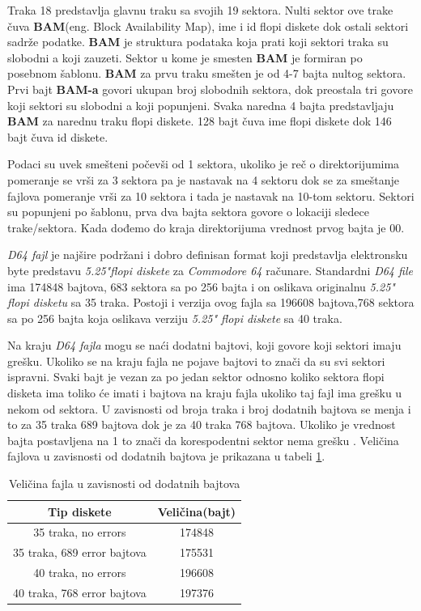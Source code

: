 Traka 18 predstavlja glavnu traku sa svojih 19 sektora. Nulti sektor ove trake čuva \textbf{BAM}(eng. Block Availability Map), ime i id flopi diskete dok ostali sektori sadrže podatke. \textbf{BAM} je struktura podataka koja prati koji sektori traka su slobodni a koji zauzeti. Sektor u kome je smesten \textbf{BAM} je formiran po posebnom šablonu. \textbf{BAM} za prvu traku smešten je od 4-7 bajta nultog sektora. Prvi bajt \textbf{BAM-a} govori ukupan broj slobodnih sektora, dok preostala tri govore koji sektori su slobodni a koji popunjeni. Svaka naredna 4 bajta predstavljaju \textbf{BAM} za narednu traku flopi diskete. 128 bajt čuva ime flopi diskete dok 146 bajt čuva id diskete.

Podaci su uvek smešteni počevši od 1 sektora, ukoliko je reč o direktorijumima pomeranje se vrši za 3 sektora pa je nastavak na 4 sektoru dok se za smeštanje fajlova pomeranje vrši za 10 sektora i tada je nastavak na 10-tom sektoru. Sektori su popunjeni po šablonu, prva dva bajta sektora govore o lokaciji sledece trake/sektora. Kada dođemo do kraja direktorijuma vrednost prvog bajta je 00.

\textit{D64 fajl} je najšire podržani i dobro definisan format koji predstavlja elektronsku byte predstavu \textit{5.25"flopi diskete} za \textit{Commodore 64} računare. Standardni \textit{D64 file} ima 174848 bajtova, 683 sektora sa po 256 bajta i on oslikava originalnu \textit{5.25" flopi disketu} sa 35 traka.  Postoji i verzija ovog fajla sa 196608 bajtova,768 sektora sa po 256 bajta koja oslikava verziju \textit{5.25" flopi diskete} sa 40 traka.

Na kraju \textit{D64 fajla} mogu se naći dodatni bajtovi, koji govore koji sektori imaju grešku. Ukoliko se na kraju fajla ne pojave bajtovi to znači da su svi sektori ispravni. Svaki bajt je vezan za po jedan sektor odnosno koliko sektora flopi disketa ima toliko će imati i bajtova na kraju fajla ukoliko taj fajl ima grešku u nekom od sektora. U zavisnosti od broja traka i broj dodatnih bajtova se menja i to za 35 traka 689 bajtova dok je za 40 traka 768 bajtova. Ukoliko je vrednost bajta postavljena na 1 to znači da korespodentni sektor nema grešku \cite{D64}. Veličina fajlova u zavisnosti od dodatnih bajtova je prikazana u tabeli \ref{tab:error_velicina}.
\begin{table}[h!]
\begin{center}
\begin{tabular}{ | c | c |} 
\hline
Tip diskete & Veličina(bajt) \\
\hline
\hline
35 traka, no errors & 174848 \\
\hline
35 traka, 689 error bajtova & 175531 \\
\hline
40 traka, no errors & 196608 \\
\hline
40 traka, 768 error bajtova & 197376 \\
\hline
\end{tabular}
\end{center}
\caption{Veličina fajla u zavisnosti od dodatnih bajtova}
\label{tab:error_velicina}
\end{table}
